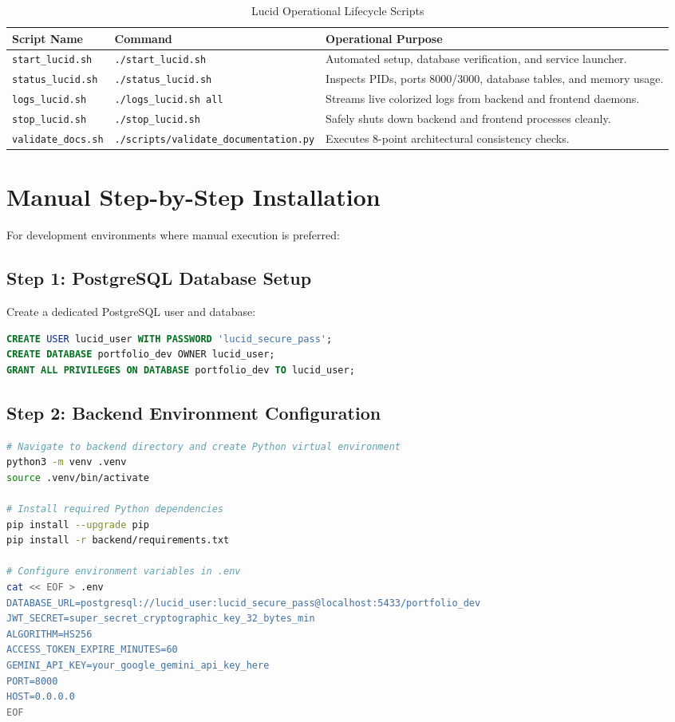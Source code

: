\begin{table}[H]
\centering
\caption{Lucid Operational Lifecycle Scripts}
\label{tab:app_lifecycle_scripts}
\begin{tabular}{llp{7.5cm}}
\toprule
\textbf{Script Name} & \textbf{Command} & \textbf{Operational Purpose} \\
\midrule
\texttt{start\_lucid.sh} & \texttt{./start\_lucid.sh} & Automated setup, database verification, and service launcher. \\
\texttt{status\_lucid.sh} & \texttt{./status\_lucid.sh} & Inspects PIDs, ports 8000/3000, database tables, and memory usage. \\
\texttt{logs\_lucid.sh} & \texttt{./logs\_lucid.sh all} & Streams live colorized logs from backend and frontend daemons. \\
\texttt{stop\_lucid.sh} & \texttt{./stop\_lucid.sh} & Safely shuts down backend and frontend processes cleanly. \\
\texttt{validate\_docs.sh} & \texttt{./scripts/validate\_documentation.py} & Executes 8-point architectural consistency checks. \\
\bottomrule
\end{tabular}
\end{table}

\section{Manual Step-by-Step Installation}
For development environments where manual execution is preferred:

\subsection{Step 1: PostgreSQL Database Setup}
Create a dedicated PostgreSQL user and database:
\begin{lstlisting}[language=sql]
CREATE USER lucid_user WITH PASSWORD 'lucid_secure_pass';
CREATE DATABASE portfolio_dev OWNER lucid_user;
GRANT ALL PRIVILEGES ON DATABASE portfolio_dev TO lucid_user;
\end{lstlisting}

\subsection{Step 2: Backend Environment Configuration}
\begin{lstlisting}[language=bash]
# Navigate to backend directory and create Python virtual environment
python3 -m venv .venv
source .venv/bin/activate

# Install required Python dependencies
pip install --upgrade pip
pip install -r backend/requirements.txt

# Configure environment variables in .env
cat << EOF > .env
DATABASE_URL=postgresql://lucid_user:lucid_secure_pass@localhost:5433/portfolio_dev
JWT_SECRET=super_secret_cryptographic_key_32_bytes_min
ALGORITHM=HS256
ACCESS_TOKEN_EXPIRE_MINUTES=60
GEMINI_API_KEY=your_google_gemini_api_key_here
PORT=8000
HOST=0.0.0.0
EOF
\end{lstlisting}

